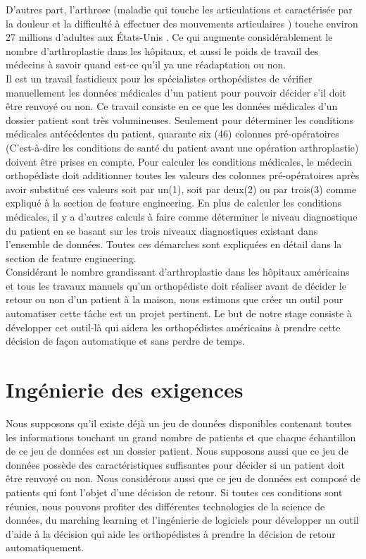 \documentclass[12pt, french]{report}
\begin{document}
D'autres part, l'arthrose (maladie qui touche les articulations et caractérisée par la douleur et la difficulté à effectuer des mouvements articulaires \cite{key12}) touche environ 27 millions d'adultes aux États-Unis \cite{key11}.  Ce qui augmente considérablement le nombre d'arthroplastie dans les hôpitaux, et aussi le poids de travail des médecins à savoir quand est-ce qu'il ya une réadaptation ou non.\\

Il est un travail fastidieux pour les spécialistes orthopédistes de vérifier manuellement les données médicales d'un patient pour pouvoir décider s'il doit être renvoyé ou non. Ce travail consiste en ce que les données médicales d'un dossier patient sont très volumineuses. Seulement pour déterminer les conditions médicales antécédentes du patient, quarante six (46) colonnes pré-opératoires (C'est-à-dire les conditions de santé du patient avant une opération arthroplastie) doivent être prises en compte. Pour calculer les conditions médicales, le médecin orthopédiste doit additionner toutes les valeurs des colonnes pré-opératoires après avoir substitué ces valeurs soit par un(1), soit par deux(2) ou par trois(3) comme expliqué à la section de feature engineering. En plus de calculer les conditions médicales, il y a d'autres calculs à faire comme déterminer le niveau diagnostique du patient en se basant sur  les trois niveaux diagnostiques existant dans l'ensemble de données. Toutes ces démarches sont expliquées en détail dans la section de feature engineering. \\

Considérant le nombre grandissant d'arthroplastie dans les hôpitaux américains et tous les travaux manuels qu'un orthopédiste doit réaliser avant de décider le retour ou non d'un patient à la maison, nous estimons que créer un outil pour automatiser cette tâche est un projet pertinent. Le but de notre stage consiste à développer cet outil-là qui aidera les orthopédistes américains à prendre cette décision de façon automatique et sans perdre de temps.  \\

\section{Ingénierie des exigences}

Nous supposons qu'il existe déjà un jeu de données disponibles contenant toutes les informations touchant un grand nombre de patients et que chaque échantillon de ce jeu de données est un dossier patient. Nous supposons aussi que ce jeu de données possède des caractéristiques suffisantes pour décider si un patient doit être renvoyé ou non. Nous considérons aussi que ce jeu de données est composé de patients qui font l'objet d'une décision de retour. Si toutes ces conditions sont réunies, nous pouvons profiter des différentes technologies de la science de données, du marching learning et l'ingénierie de logiciels pour développer un outil d'aide à la décision qui aide les orthopédistes à prendre la décision de retour automatiquement. \\
\end{document}

